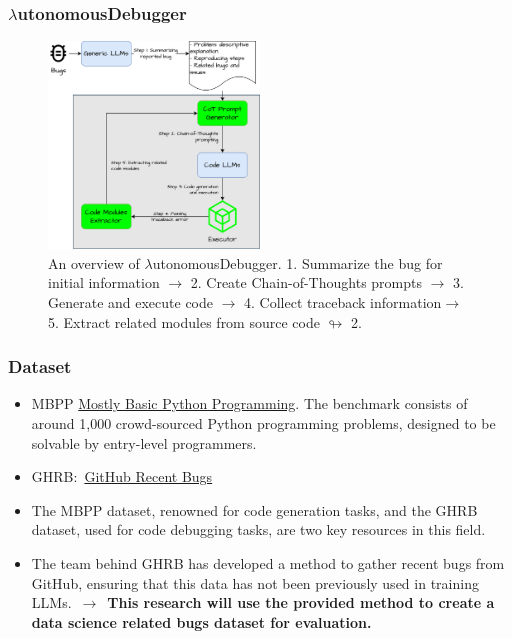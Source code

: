\documentclass{beamer}
\begin{document}
\begin{frame}[allowframebreaks]
\frametitle{$\lambda$utonomousDebugger}
  \begin{figure}
    \centering
    \includegraphics[width=0.50\textwidth]{img/autonomous_debugger.png}
    \caption{An overview of $\lambda$utonomousDebugger. 1. Summarize the bug for initial information $\rightarrow$ 2. Create Chain-of-Thoughts prompts $\rightarrow$ 3. Generate and execute code $\rightarrow$ 4. Collect traceback information$\rightarrow$ 5. Extract related modules from source code $\looparrowright$ 2.}
  \end{figure}
\end{frame}

\begin{frame}[allowframebreaks]
\frametitle{Dataset}
  \begin{itemize}
    \item MBPP \href{https://huggingface.co/datasets/mbpp}{Mostly Basic Python Programming}. The benchmark consists of around 1,000 crowd-sourced Python programming problems, designed to be solvable by entry-level programmers.~\cite{austin2021program}
    \item GHRB:~\href{https://github.com/coinse/GHRB}{GitHub Recent Bugs}~\cite{lee2023github}
    \item The MBPP dataset, renowned for code generation tasks, and the GHRB dataset, used for code debugging tasks, are two key resources in this field.
    \item The team behind GHRB has developed a method to gather recent bugs from GitHub, ensuring that this data has not been previously used in training LLMs.~$\rightarrow$~\textbf{This research will use the provided method to create a data science related bugs dataset for evaluation.}
  \end{itemize}
\end{frame}
\end{document}
